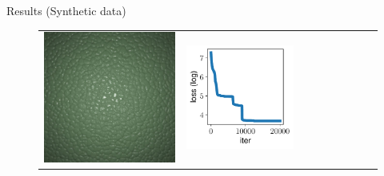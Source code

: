 \documentclass[final]{beamer}
\newlength{\twocolwid}
\newlength{\resultwidth}
\begin{document}
\begin{frame}[t]
\begin{columns}[t]
\begin{column}{\twocolwid}
\begin{block}{Results (Synthetic data)}
\begin{figure}[t]
\begin{tabular}{ccrclcccc}
            		\includegraphics[width=\resultwidth]{images/synth/leather/target.jpg} &
            		\includegraphics[width=\resultwidth]{images/synth/leather/loss.pdf} &

\end{tabular}
\end{figure}
\end{block}
\end{column}
\end{columns}
\end{frame}
\end{document}
